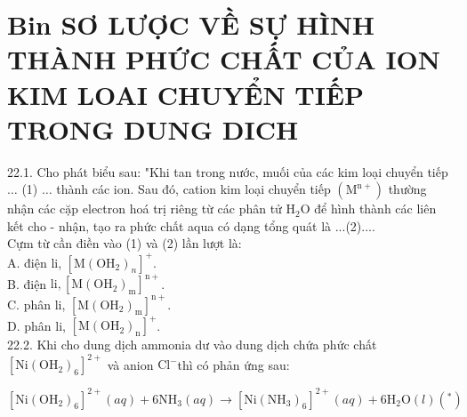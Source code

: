 \documentclass[10pt]{article}
\begin{document}
\section*{Bin SƠ LƯỢC VỀ SỰ HÌNH THÀNH PHỨC CHẤT CỦA ION KIM LOAI CHUYỂN TIẾP TRONG DUNG DICH}
22.1. Cho phát biểu sau: "Khi tan trong nước, muối của các kim loại chuyển tiếp $\ldots$ (1) $\ldots$ thành các ion. Sau đó, cation kim loại chuyển tiếp $\left(\mathrm{M}^{\mathrm{n}+}\right)$ thường nhận các cặp electron hoá trị riêng từ các phân tử $\mathrm{H}_{2} \mathrm{O}$ để hình thành các liên kết cho - nhận, tạo ra phức chất aqua có dạng tổng quát là ...(2)....\\
Cựm từ cần điền vào (1) và (2) lần lượt là:\\
A. điện li, $\left[\mathrm{M}\left(\mathrm{OH}_{2}\right)_{n}\right]^{+}$.\\
B. điện $\mathrm{li},\left[\mathrm{M}\left(\mathrm{OH}_{2}\right)_{\mathrm{m}}\right]^{\mathrm{n}+}$.\\
C. phân li, $\left[\mathrm{M}\left(\mathrm{OH}_{2}\right)_{\mathrm{m}}\right]^{\mathrm{n}+}$.\\
D. phân li, $\left[\mathrm{M}\left(\mathrm{OH}_{2}\right)_{\mathrm{n}}\right]^{+}$.\\
22.2. Khi cho dung dịch ammonia dư vào dung dịch chứa phức chất $\left[\mathrm{Ni}\left(\mathrm{OH}_{2}\right)_{6}\right]^{2+}$ và anion $\mathrm{Cl}^{-}$thì có phản ứng sau:

$$
\left[\mathrm{Ni}\left(\mathrm{OH}_{2}\right)_{6}\right]^{2+}(a q)+6 \mathrm{NH}_{3}(a q) \rightarrow\left[\mathrm{Ni}\left(\mathrm{NH}_{3}\right)_{6}\right]^{2+}(a q)+6 \mathrm{H}_{2} \mathrm{O}(l)\left(^{*}\right)
$$
\end{document}
